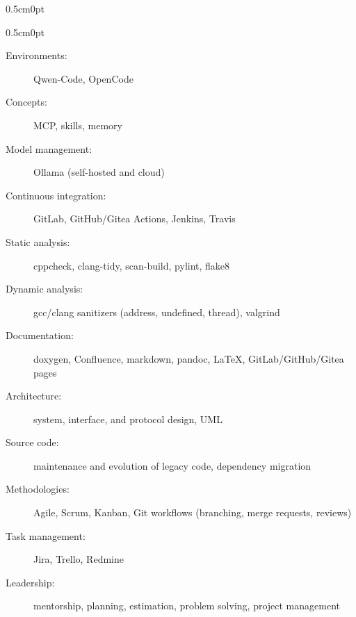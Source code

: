 \documentclass[a4paper,10pt]{report}
\newenvironment{cvindent}{\begin{adjustwidth}{0.5cm}{0pt}}{\end{adjustwidth}}
\newenvironment{cvdescription}[1][]{\begin{cvindent}\begin{description}[#1]}{\end{description}\end{cvindent}}
\begin{document}
\begin{cvindent}
\begin{cvdescription}
    \item[Agentic (AI-assisted) coding] \leavevmode
        \begin{description}
            \item[Environments:]     Qwen-Code, OpenCode
            \item[Concepts:]         MCP, skills, memory
            \item[Model management:] Ollama (self-hosted and cloud)
        \end{description}

    \item[Software quality] \leavevmode
        \begin{description}
            \item[Continuous integration:] GitLab, GitHub/Gitea Actions, Jenkins, Travis
            \item[Static analysis:]        cppcheck, clang-tidy, scan-build, pylint, flake8
            \item[Dynamic analysis:]       gcc/clang sanitizers (address, undefined, thread), valgrind
            \item[Documentation:]          doxygen, Confluence, markdown, pandoc, \LaTeX, GitLab/GitHub/Gitea pages
        \end{description}

    \item[Process] \leavevmode
        \begin{description}
            \item[Architecture:]    system, interface, and protocol design, UML
            \item[Source code:]     maintenance and evolution of legacy code, dependency migration
            \item[Methodologies:]   Agile, Scrum, Kanban, Git workflows (branching, merge requests, reviews)
            \item[Task management:] Jira, Trello, Redmine
            \item[Leadership:]      mentorship, planning, estimation, problem solving, project management
        \end{description}
\end{cvdescription}


\end{cvindent}
\end{document}

